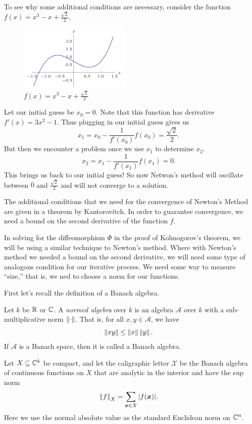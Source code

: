 \documentclass[twoside,letterpaper,10pt]{article}
\begin{document}
To see why some additional conditions are necessary, consider the function $f(x)
= x^3 - x + \frac{\sqrt{2}}{2}$.
\begin{figure}
  \begin{center}
    \includegraphics[width=0.48\textwidth]{newtonfail}
  \end{center}
  \caption{$f(x) = x^3 - x + \frac{\sqrt{2}}{2}$}
\end{figure}
Let our initial guess be $x_0 = 0$.
Note that this function has derivative $f'(x) = 3x^2 - 1$.
Thus plugging in our initial guess gives us
\begin{equation*}
  x_1 = x_0 - \frac{1}{f'(x_0)} f(x_0) = \frac{\sqrt{2}}{2}.
\end{equation*}
But then we encounter a problem once we use $x_1$ to determine $x_2$.
\begin{equation*}
  x_2 = x_1 - \frac{1}{f'(x_1)} f(x_1) = 0.
\end{equation*}
This brings us back to our initial guess!
So now Netwon's method will oscillate between $0$ and $\frac{\sqrt{2}}{2}$ and
will not converge to a solution.

The additional conditions that we need for the convergence of Newton's Method
are given in a theorem by Kantorovitch.
In order to guarantee convergence, we need a bound on the second derivative of
the function $f$.

In solving for the diffeomorphism $\Phi$ in the proof of Kolmogorov's theorem,
we will be using a similar technique to Newton's method.
Where with Newton's method we needed a bound on the second derivative, we will
need some type of analogous condition for our iterative process.
We need some way to measure ``size,'' that is, we ned to choose a norm for our
functions.

First let's recall the definition of a Banach algebra.
\begin{defn}
  Let $k$ be $\mathbb{R}$ or $\mathbb{C}$.
  A \emph{normed algebra} over $k$ is an algebra $\mathcal{A}$ over $k$ with a
  sub-multiplicative norm $\norm{\cdot}$.
  That is, for all $x, y \in \mathcal{A}$, we have
  \begin{equation*}
    \norm{xy} \leq \norm{x}\norm{y}.
  \end{equation*}
  If $\mathcal{A}$ is a Banach space, then it is called a Banach algebra.
\end{defn}
Let $X \subseteq \mathbb{C}^k$ be compact, and let the caligraphic letter $\mathcal{X}$
be the Banach algebra of continuous functions on $X$ that are analytic in the
interior and have the sup norm
\begin{equation*}
  \norm{f}_X = \sum_{\bp{x} \in X} |f(\bp{x})|.
\end{equation*}
Here we use the normal absolute value as the standard Euclidean norm on $\mathbb{C}^n$.
\end{document}
